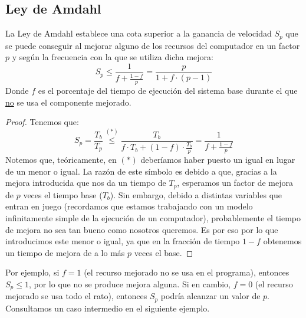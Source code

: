 \subsection{Ley de Amdahl} \label{sec:amdahl}
La Ley de Amdahl establece una cota superior a la ganancia de velocidad $S_p$ que se puede conseguir al mejorar alguno de los recursos del computador en un factor $p$ y según la frecuencia con la que se utiliza dicha mejora:
\begin{equation}
    S_p \leq \frac{1}{f+\frac{1-f}{p}} =  \dfrac{p}{1+f\cdot (p-1)}
\end{equation}
Donde $f$ es el porcentaje del tiempo de ejecución del sistema base durante el que \ul{no} se usa el componente mejorado.
\begin{proof}
    Tenemos que:
    \begin{equation*}
        S_p = \dfrac{T_b}{T_p} \stackrel{(\ast)}{\leq} \dfrac{T_b}{f\cdot T_b + (1-f)\cdot \frac{T_b}{p}} = \dfrac{1}{f + \frac{1-f}{p}}
    \end{equation*}
    Notemos que, teóricamente, en $(\ast)$ deberíamos haber puesto un igual en lugar de un menor o igual. La razón de este símbolo es debido a que, gracias a la mejora introducida que nos da un tiempo de $T_p$, esperamos un factor de mejora de $p$ veces el tiempo base ($T_b$). Sin embargo, debido a distintas variables que entran en juego (recordamos que estamos trabajando con un modelo infinitamente simple de la ejecución de un computador), probablemente el tiempo de mejora no sea tan bueno como nosotros queremos. Es por eso por lo que introducimos este menor o igual, ya que en la fracción de tiempo $1-f$ obtenemos un tiempo de mejora de a lo más $p$ veces el base.
\end{proof}


Por ejemplo, si $f = 1$ (el recurso mejorado no se usa en el programa), entonces $S_p \leq 1$, por lo que no se produce mejora alguna. Si en cambio, $f = 0$ (el recurso mejorado se usa todo el rato), entonces $S_p$ podría alcanzar un valor de $p$. Consultamos un caso intermedio en el siguiente ejemplo.

